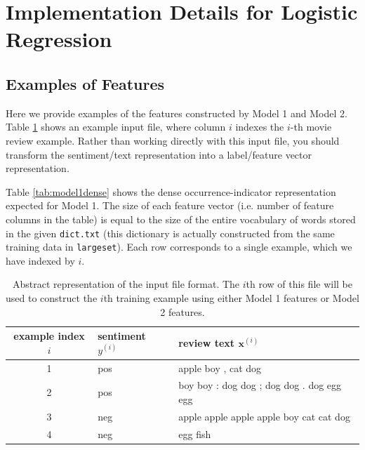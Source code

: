 \documentclass[11pt,addpoints,answers]{exam}
\newcommand{\xv}{\mathbf{x}}
\begin{document}
    
    



\newpage

\appendix


\section{Implementation Details for Logistic Regression}

\subsection{Examples of Features}

Here we provide examples of the features constructed by Model 1 and Model 2. Table \ref{tab:inputfile} shows an example input file, where column $i$  indexes the $i$-th movie review example. Rather than working directly with this input file, you should transform the sentiment/text representation into a label/feature vector representation.

Table \ref{tab:model1dense} shows the dense occurrence-indicator representation expected for Model 1. The size of each feature vector (i.e. number of feature columns in the table) is equal to the size of the entire vocabulary of words stored in the given \lstinline{dict.txt} (this dictionary is actually constructed from the same training data in \lstinline{largeset}). Each row corresponds to a single example, which we have indexed by $i$.










\begin{table}[p]
    \centering
%
\begin{tabular}{cll}
\toprule
{\bf example index} $i$  & {\bf sentiment $y^{(i)}$ } & {\bf review text $\xv^{(i)}$ }\\
\midrule
1 & pos & apple boy , cat dog \\
2 & pos & boy boy : dog dog ; dog dog . dog egg egg \\
3 & neg & apple apple apple apple boy cat cat dog \\
4 & neg & egg fish \\

\bottomrule
\end{tabular}
%
    \caption{Abstract representation of the input file format.  The $i$th row of this file will be used to construct the $i$th training example using either Model 1 features or Model 2 features.}
    \label{tab:inputfile}
\end{table}
\end{document}
